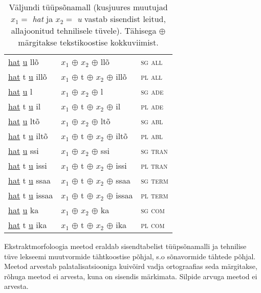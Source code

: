 \documentclass[12pt,a4paper]{article}
\begin{document}
\begin{table}[H]
\begin{minipage}[t]{.55\textwidth}
\begin{tabular}[t]{l l l}
      \underline{hat}   \underline{u} llõ   & $x_1$ $\oplus$ $x_2$ $\oplus$ llõ       & \textsc{sg all} \\
      \underline{hat} t \underline{u} illõ  & $x_1$ $\oplus$ t $\oplus$ $x_2$ $\oplus$ illõ  & \textsc{pl all} \\
      \underline{hat}   \underline{u} l     & $x_1$ $\oplus$ $x_2$ $\oplus$ l         & \textsc{sg ade} \\
      \underline{hat} t \underline{u} il    & $x_1$ $\oplus$ t $\oplus$ $x_2$ $\oplus$ il    & \textsc{pl ade} \\
      \underline{hat}   \underline{u} ltõ   & $x_1$ $\oplus$ $x_2$ $\oplus$ ltõ       & \textsc{sg abl} \\
      \underline{hat} t \underline{u} iltõ  & $x_1$ $\oplus$ t $\oplus$ $x_2$ $\oplus$ iltõ  & \textsc{pl abl} \\
      \underline{hat}   \underline{u} ssi   & $x_1$ $\oplus$ $x_2$ $\oplus$ ssi       & \textsc{sg tran} \\
      \underline{hat} t \underline{u} issi  & $x_1$ $\oplus$ t $\oplus$ $x_2$ $\oplus$ issi  & \textsc{pl tran} \\
      \underline{hat} t \underline{u} ssaa  & $x_1$ $\oplus$ t $\oplus$ $x_2$ $\oplus$ ssaa  & \textsc{sg term} \\
      \underline{hat} t \underline{u} issaa & $x_1$ $\oplus$ t $\oplus$ $x_2$ $\oplus$ issaa & \textsc{pl term} \\
      \underline{hat}   \underline{u} ka    & $x_1$ $\oplus$ $x_2$ $\oplus$ ka        & \textsc{sg com} \\
      \underline{hat} t \underline{u} ika   & $x_1$ $\oplus$ t $\oplus$ $x_2$ $\oplus$ ika   & \textsc{pl com} \\
    \end{tabular}
    \caption{Väljundi tüüpsõnamall (kus\-juures muutujad $x_1 = $ \textit{hat} ja $x_2 = $ \textit{u} vastab sisendist leitud, allajoonitud tehnilisele tüvele). Tähisega $\oplus$ märgitakse teksti\-koostise kokku\-viimist.}
    \label{tab:väljundtabel-katto}
  \end{minipage}
\end{table}

Ekstraktmorfoloogia meetod eraldab sisendtabelist tüüp\-sõna\-malli ja tehnilise tüve lekseemi muutvormide tähtkoostise põhjal, s.o sõnavormide tähtede põhjal. Meetod arvestab palatalisatsiooniga kuivõird vadja ortograafias seda märgitakse, rõhuga meetod ei arvesta, kuna on sisendis märkimata. Silpide arvuga meetod ei arvesta. %
\end{document}
